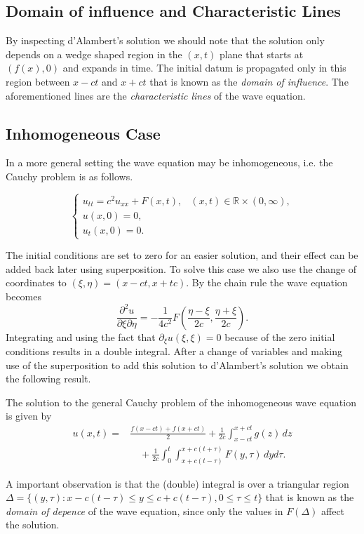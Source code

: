 \subsection{Domain of influence and Characteristic Lines}

By inspecting d'Alambert's solution we should note that the solution only
depends on a wedge shaped region in the $(x,t)$ plane that starts at
$(f(x),0)$ and expands in time. The initial datum is propagated only in this
region between $x-ct$ and $x+ct$ that is known as the \emph{domain of
influence}. The aforementioned lines are the \emph{characteristic lines} of
the wave equation.

\subsection{Inhomogeneous Case}

In a more general setting the wave equation may be inhomogeneous, i.e. the
Cauchy problem is as follows.

\begin{defn}
  \label{def:wave:inhom-cauchy}
  \[
    \begin{cases}
      u_{tt} =  c^2 u_{xx} + F(x,t), 
        & (x, t) \in\mathbb{R} \times (0, \infty), \\
      u(x,0) = 0, \\
      u_t(x,0) = 0.
    \end{cases}
  \]
\end{defn}

The initial conditions are set to zero for an easier solution, and their
effect can be added back later using superposition. To solve this case we also
use the change of coordinates to $(\xi,\eta) = (x-ct, x+tc)$. By the chain
rule the wave equation becomes
\[
  \frac{\partial^2 u}{\partial \xi \partial \eta}
  = -\frac{1}{4c^2} F\left(\frac{\eta - \xi}{2c}, \frac{\eta + \xi}{2c}\right).
\]
Integrating and using the fact that $\partial_\xi u(\xi,\xi) = 0$ because of
the zero initial conditions results in a double integral. After a change of
variables and making use of the superposition to add this solution to
d'Alambert's solution we obtain the following result.

\begin{thm}
  The solution to the general Cauchy problem of the inhomogeneous wave
  equation is given by
  \begin{align*}
    u(x,t) = &\frac{f(x-ct) + f(x+ct)}{2} 
      + \frac{1}{2c} \int_{x-ct}^{x+ct} g(z) \,dz \\
      &\quad + \frac{1}{2c}
        \int_0^t \int_{x+c(t-\tau)}^{x+c(t+\tau)} F(y, \tau) \, dy d\tau.
  \end{align*}
\end{thm}

A important observation is that the (double) integral is over a triangular
region $\Delta = \{ (y,\tau) : x - c(t - \tau) \leq y \leq c + c(t - \tau), 0
\leq \tau \leq t\}$ that is known as the \emph{domain of depence} of the wave
equation, since only the values in $F(\Delta)$ affect the solution.

